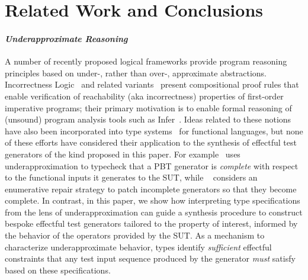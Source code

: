 \section{Related Work and Conclusions}
\label{sec:related}
\paragraph{\it Underapproximate Reasoning} A number of recently
proposed logical frameworks provide program reasoning principles based
on under-, rather than over-, approximate abstractions.  Incorrectness
Logic~\cite{OHP19} and related variants~\cite{LR+22,RBD+20,ZDS23}
present compositional proof rules that enable verification of
reachability (aka incorrectness) properties of first-order imperative
programs; their primary motivation is to enable formal reasoning of
(unsound) program analysis tools such as Infer~\cite{DFLO19}.  Ideas
related to these notions have also been incorporated into type
systems~\cite{RW24,CoverageType,JY15,LPR26} for functional languages,
but none of these efforts have considered their application to the
synthesis of effectful test generators of the kind proposed in this
paper.  For example~\cite{CoverageType} uses underapproximation to
typecheck that a PBT generator is \emph{complete} with respect to the
functional inputs it generates to the SUT, while ~\cite{LZ+25}
considers an enumerative repair strategy to patch incomplete
generators so that they become complete.  In contrast, in this paper,
we show how interpreting type specifications from the lens of
underapproximation can guide a synthesis procedure to construct
bespoke effectful test generators tailored to the property of
interest, informed by the behavior of the operators provided by the
SUT.  As a mechanism to characterize underapproximate behavior, types
identify \emph{sufficient} effectful constraints that any test input
sequence produced by the generator \emph{must} satisfy based on these
specifications.
